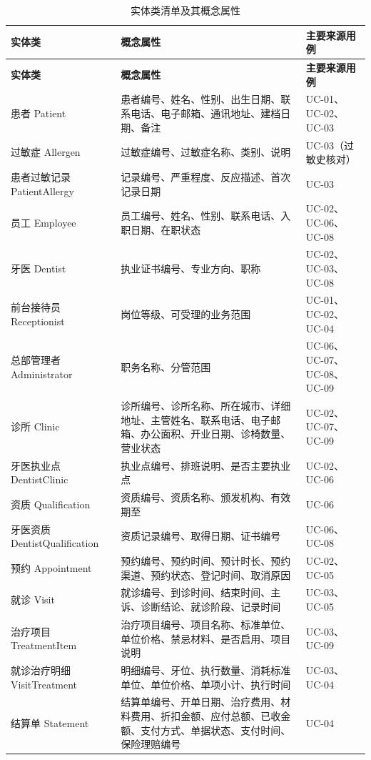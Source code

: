 \documentclass[11pt,a4paper]{ctexart}
\begin{document}
{\small
\begin{longtable}{@{}L{2.7cm}L{6.3cm}L{6.3cm}@{}}
\caption{实体类清单及其概念属性}\\
\toprule
\textbf{\textcolor{adcblue!92}{实体类}} & \textbf{\textcolor{adcblue!92}{概念属性}} & \textbf{\textcolor{adcblue!92}{主要来源用例}} \\
\midrule
\endfirsthead
\toprule
\textbf{\textcolor{adcblue!92}{实体类}} & \textbf{\textcolor{adcblue!92}{概念属性}} & \textbf{\textcolor{adcblue!92}{主要来源用例}} \\
\midrule
\endhead
\bottomrule
\endlastfoot
患者 Patient & 患者编号、姓名、性别、出生日期、联系电话、电子邮箱、通讯地址、建档日期、备注 & UC-01、UC-02、UC-03 \\
过敏症 Allergen & 过敏症编号、过敏症名称、类别、说明 & UC-03（过敏史核对） \\
患者过敏记录 PatientAllergy & 记录编号、严重程度、反应描述、首次记录日期 & UC-03 \\
员工 Employee & 员工编号、姓名、性别、联系电话、入职日期、在职状态 & UC-02、UC-06、UC-08 \\
牙医 Dentist & 执业证书编号、专业方向、职称 & UC-02、UC-03、UC-08 \\
前台接待员 Receptionist & 岗位等级、可受理的业务范围 & UC-01、UC-02、UC-04 \\
总部管理者 Administrator & 职务名称、分管范围 & UC-06、UC-07、UC-08、UC-09 \\
诊所 Clinic & 诊所编号、诊所名称、所在城市、详细地址、主管姓名、联系电话、电子邮箱、办公面积、开业日期、诊椅数量、营业状态 & UC-02、UC-07、UC-09 \\
牙医执业点 DentistClinic & 执业点编号、排班说明、是否主要执业点 & UC-02、UC-06 \\
资质 Qualification & 资质编号、资质名称、颁发机构、有效期至 & UC-06 \\
牙医资质 DentistQualification & 资质记录编号、取得日期、证书编号 & UC-06、UC-08 \\
预约 Appointment & 预约编号、预约时间、预计时长、预约渠道、预约状态、登记时间、取消原因 & UC-02、UC-05 \\
就诊 Visit & 就诊编号、到诊时间、结束时间、主诉、诊断结论、就诊阶段、记录时间 & UC-03、UC-05 \\
治疗项目 TreatmentItem & 治疗项目编号、项目名称、标准单位、单位价格、禁忌材料、是否启用、项目说明 & UC-03、UC-09 \\
就诊治疗明细 VisitTreatment & 明细编号、牙位、执行数量、消耗标准单位、单位价格、单项小计、执行时间 & UC-03、UC-04 \\
结算单 Statement & 结算单编号、开单日期、治疗费用、材料费用、折扣金额、应付总额、已收金额、支付方式、单据状态、支付时间、保险理赔编号 & UC-04 \\
\end{longtable}
}
\end{document}
